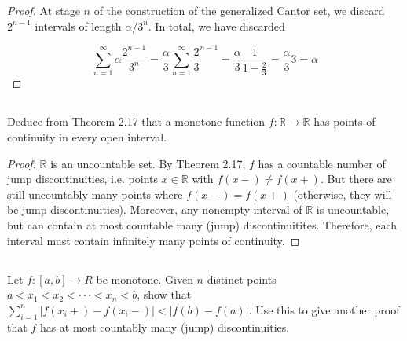 \begin{proof}
At stage $n$ of the construction of the generalized Cantor set, we discard $2^{n-1}$ intervals of length $\alpha / 3^n$. In total, we have discarded

$$\sum_{n=1}^\infty \alpha\frac{2^{n-1}}{3^n} = \frac{\alpha}{3} \sum_{n=1}^\infty \frac{2}{3}^{n-1} = \frac{\alpha}{3}  \frac{1}{1 - \frac{2}{3}} = \frac{\alpha}{3} 3 = \alpha$$
\end{proof}

\subsection{} Deduce from Theorem 2.17 that a monotone function $f :  \mathbb{R} \rightarrow \mathbb{R}$ has points of continuity in every open interval. 

\begin{proof}
$\mathbb{R}$ is an uncountable set. By Theorem 2.17, $f$ has a countable number of jump discontinuities, i.e. points $x \in \mathbb{R}$ with $f(x-) \neq f(x+)$. But there are still uncountably many points where $f(x-) = f(x+)$ (otherwise, they will be jump discontinuities). Moreover, any nonempty interval of $\mathbb{R}$ is uncountable, but can contain at most countable many (jump) discontinuitites. Therefore, each interval must contain infinitely many points of continuity.
\end{proof}


\subsection{} Let $f :[a, b] \rightarrow R$ be monotone. Given $n$ distinct points $a < x_1  < x_2 < ··· < x_n < b$, show that $\sum_{i=1}^n |f(x_i+)-f(x_i-)| < |f(b)-f(a)|$. Use this to give another proof that $f$ has at most countably many (jump) discontinuities. 

